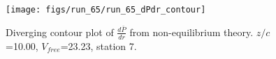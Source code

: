 \begin{figure}[H]
\centering
\texttt{[image: figs/run\_65/run\_65\_dPdr\_contour]}
\caption{Diverging contour plot of $\frac{d\bar{P}}{dr}$ from non-equilibrium theory. $z/c$=10.00, $V_{free}$=23.23, station 7.}
\label{fig:run_65_dPdr_contour}
\end{figure}



